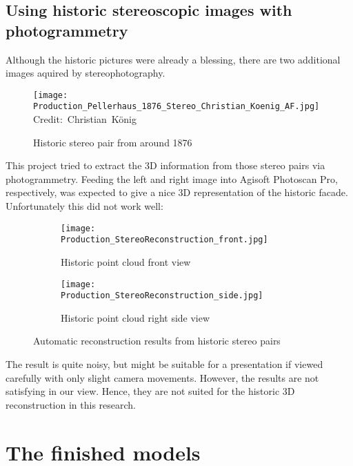 \subsection{Using historic stereoscopic images with photogrammetry}

Although the historic pictures were already a blessing, there are two additional images aquired by stereophotography.


\begin{figure}[h]
	\centering
	\texttt{[image: Production\_Pellerhaus\_1876\_Stereo\_Christian\_Koenig\_AF.jpg]}
	\hbox{\scriptsize Credit: Christian König}
	\caption{Historic stereo pair from around 1876}
	\label{fig:production_stereo_historic}
\end{figure}


This project tried to extract the 3D information from those stereo pairs via photogrammetry. Feeding the left and right image into Agisoft Photoscan Pro, respectively, was expected to give a nice 3D representation of the historic facade. Unfortunately this did not work well:

\begin{figure}[h]
	\centering
	\begin{subfigure}[b]{0.45\textwidth}
		\centering
		\texttt{[image: Production\_StereoReconstruction\_front.jpg]}
		\caption{Historic point cloud front view}
		\label{fig:production_historic_stereo_reconstruction_front}
	\end{subfigure}
	\hfill
	\begin{subfigure}[b]{0.45\textwidth}
		\centering
		\texttt{[image: Production\_StereoReconstruction\_side.jpg]}
		\caption{Historic point cloud right side view}
		\label{fig:production_historic_stereo_reconstruction_side}
	\end{subfigure}
	\caption{Automatic reconstruction results from historic stereo pairs}
	\label{fig:production_historic_stereo_reconstruction}
\end{figure}

The result is quite noisy, but might be suitable for a presentation if viewed carefully with only slight camera movements. However, the results are not satisfying in our view. Hence, they are not suited for the historic 3D reconstruction in this research.

\pagebreak

\section{The finished models}

